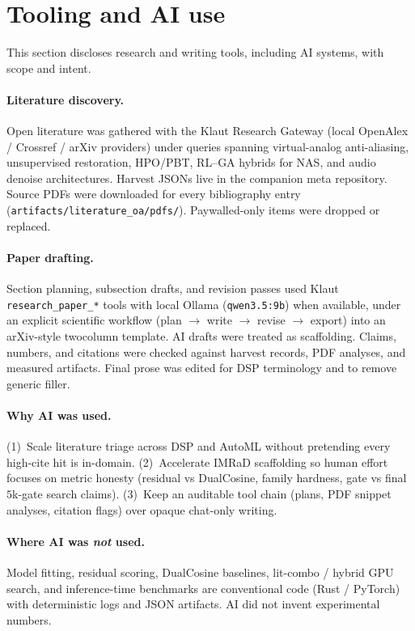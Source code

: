 \section{Tooling and AI use}
\label{sec:tooling}

This section discloses research and writing tools, including AI systems, with
scope and intent.

\paragraph{Literature discovery.}
Open literature was gathered with the Klaut Research Gateway (local OpenAlex /
Crossref / arXiv providers) under queries spanning virtual-analog anti-aliasing,
unsupervised restoration, HPO/PBT, RL--GA hybrids for NAS, and audio denoise
architectures.
Harvest JSONs live in the companion meta repository.
Source PDFs were downloaded for every bibliography entry
(\texttt{artifacts/literature\_oa/pdfs/}).
Paywalled-only items were dropped or replaced.

\paragraph{Paper drafting.}
Section planning, subsection drafts, and revision passes used Klaut
\texttt{research\_paper\_*} tools with local Ollama (\texttt{qwen3.5:9b}) when
available, under an explicit scientific workflow (plan $\rightarrow$ write
$\rightarrow$ revise $\rightarrow$ export) into an arXiv-style twocolumn
template.
AI drafts were treated as scaffolding. Claims, numbers, and citations
were checked against harvest records, PDF analyses, and measured artifacts.
Final prose was edited for DSP terminology and to remove generic filler.

\paragraph{Why AI was used.}
(1)~Scale literature triage across DSP and AutoML without pretending every
high-cite hit is in-domain.
(2)~Accelerate IMRaD scaffolding so human effort
focuses on metric honesty (residual vs DualCosine, family hardness, gate vs
final $5$k-gate search claims).
(3)~Keep an auditable tool chain (plans, PDF
snippet analyses, citation flags) over opaque chat-only writing.

\paragraph{Where AI was \emph{not} used.}
Model fitting, residual scoring, DualCosine baselines, lit-combo / hybrid
GPU search, and inference-time benchmarks are conventional code (Rust / PyTorch)
with deterministic logs and JSON artifacts.
AI did not invent experimental numbers.

